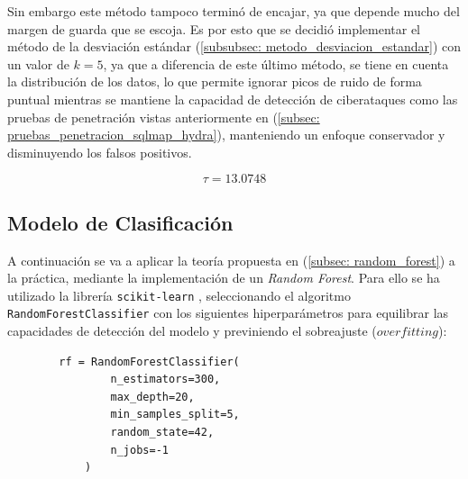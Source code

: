 \documentclass[12pt]{article}
\numberwithin{equation}{section} %
\begin{document}
    \vspace{2.5mm}

    Sin embargo este método tampoco terminó de encajar, ya que depende mucho del margen de guarda que se escoja. Es por esto que se decidió implementar el método de la desviación estándar (\ref{subsubsec: metodo_desviacion_estandar}) con un valor de $k = 5$, ya que a diferencia de este último método, se tiene en cuenta la distribución de los datos, lo que permite ignorar picos de ruido de forma puntual mientras se mantiene la capacidad de detección de ciberataques como las pruebas de penetración vistas anteriormente en (\ref{subsec: pruebas_penetracion_sqlmap_hydra}), manteniendo un enfoque conservador y disminuyendo los falsos positivos.

    \vspace{2.5mm}

    \begin{equation*}
        \boxed{\tau = 13.0748}
    \end{equation*}

    \vspace{10mm}





    \subsection{Modelo de Clasificación}\label{subsec: modelo_clasificacion_impl}

    \vspace{5mm}

    A continuación se va a aplicar la teoría propuesta en (\ref{subsec: random_forest}) a la práctica, mediante la implementación de un \textit{Random Forest}. Para ello se ha  utilizado la librería \texttt{scikit-learn} \cite{sklearn-docs}, seleccionando el algoritmo \texttt{RandomForestClassifier} con los siguientes hiperparámetros para equilibrar las capacidades de detección del modelo y previniendo el sobreajuste ($overfitting$):

    \vspace{2.5mm}

    \begin{verbatim}
        rf = RandomForestClassifier(
                n_estimators=300, 
                max_depth=20, 
                min_samples_split=5,
                random_state=42, 
                n_jobs=-1
            )
    \end{verbatim}
\end{document}
